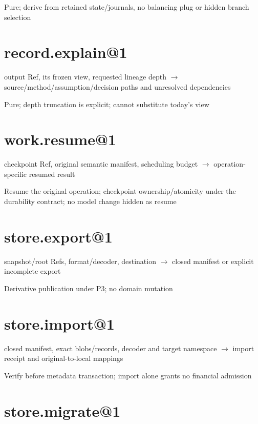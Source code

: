 Pure; derive from retained state/journals, no balancing plug or hidden branch selection

\hypertarget{record.explain1}{%
\section{record.explain@1}\label{record.explain1}}

output Ref, its frozen view, requested lineage depth \ensuremath{\rightarrow} source/method/assumption/decision paths and unresolved dependencies

Pure; depth truncation is explicit; cannot substitute today's view

\hypertarget{work.resume1}{%
\section{work.resume@1}\label{work.resume1}}

checkpoint Ref, original semantic manifest, scheduling budget \ensuremath{\rightarrow} operation-specific resumed result

Resume the original operation; checkpoint ownership/atomicity under the durability contract; no model change hidden as resume

\hypertarget{store.export1}{%
\section{store.export@1}\label{store.export1}}

snapshot/root Refs, format/decoder, destination \ensuremath{\rightarrow} closed manifest or explicit incomplete export

Derivative publication under P3; no domain mutation

\hypertarget{store.import1}{%
\section{store.import@1}\label{store.import1}}

closed manifest, exact blobs/records, decoder and target namespace \ensuremath{\rightarrow} import receipt and original-to-local mappings

Verify before metadata transaction; import alone grants no financial admission

\hypertarget{store.migrate1}{%
\section{store.migrate@1}\label{store.migrate1}}

